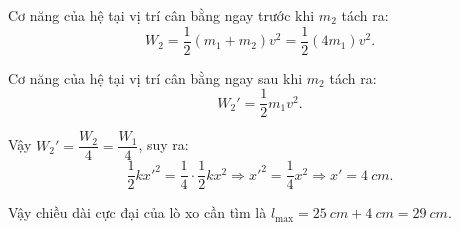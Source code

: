 \begin{enumerate}[label=\bfseries Câu \arabic*:]
{			Cơ năng của hệ tại vị trí cân bằng ngay trước khi $m_2$ tách ra:
			$$W_2 = \dfrac{1}{2} (m_1+m_2)v^2 = \dfrac{1}{2} (4m_1) v^2.$$
			
			Cơ năng của hệ tại vị trí cân bằng ngay sau khi $m_2$ tách ra:
			$$W_2' = \dfrac{1}{2}m_1v^2.$$
			
			Vậy $W_2'= \dfrac{W_2}{4} = \dfrac{W_1}{4}$, suy ra:
			$$\dfrac{1}{2}k x'^2 = \dfrac{1}{4} \cdot \dfrac{1}{2}kx^2 \Rightarrow x'^2 = \dfrac{1}{4}x^2 \Rightarrow x'=\SI{4}{cm}.$$
			
			Vậy chiều dài cực đại của lò xo cần tìm là $l_\text{max} = \SI{25}{cm} + \SI{4}{cm} = \SI{29}{cm}$.
		}
	
	\end{enumerate}

\whiteBGstarEnd